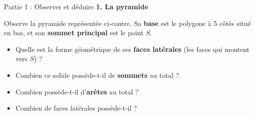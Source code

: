 \documentclass[a4paper]{book}
\begin{document}
\setcounter{chapter}{14} 
\renewcommand{\monTitre}{Pyramides et cônes}

\enteteActivite{1}{\monTitre}{\thechapter}


    \begin{exerciceTitre}{Partie 1 : Observer et déduire}
        \textbf{1. La pyramide} \\
        \begin{minipage}{0.55\textwidth}
            Observe la pyramide représentée ci-contre. Sa \textbf{base} est le polygone à 5 côtés situé en bas, et son \textbf{sommet principal} est le point $S$.
            \begin{itemize}
                \item Quelle est la forme géométrique de ses \textbf{faces latérales} (les faces qui montent vers $S$) ? \dotfill
                \item Combien ce solide possède-t-il de \textbf{sommets} au total ? \dotfill
                \item Combien possède-t-il d'\textbf{arêtes} au total ? \dotfill
                \item Combien de faces latérales possède-t-il ? \dotfill
            \end{itemize}
        \end{minipage}
        \hfill
        \begin{minipage}{0.4\textwidth}
            \centering
\end{minipage}
\end{exerciceTitre}
\end{document}
